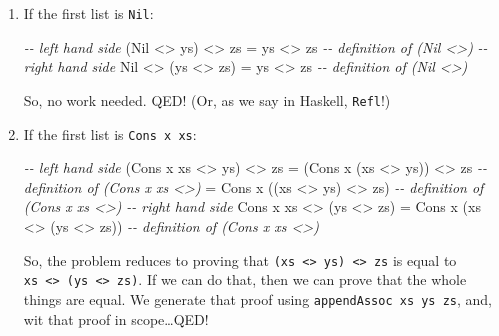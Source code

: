 \documentclass[]{article}
\newenvironment{Shaded}{}{}
\newcommand{\CommentTok}[1]{\textcolor[rgb]{0.38,0.63,0.69}{\textit{#1}}}
\newcommand{\DataTypeTok}[1]{\textcolor[rgb]{0.56,0.13,0.00}{#1}}
\newcommand{\NormalTok}[1]{#1}
\newcommand{\OperatorTok}[1]{\textcolor[rgb]{0.40,0.40,0.40}{#1}}
\newcommand{\OtherTok}[1]{\textcolor[rgb]{0.00,0.44,0.13}{#1}}
\begin{document}
\begin{enumerate}
\def\labelenumi{\arabic{enumi}.}
\item
  If the first list is \texttt{Nil}:

\begin{Shaded}
\begin{Highlighting}[]
\CommentTok{{-}{-} left hand side}
\NormalTok{(}\DataTypeTok{Nil} \OperatorTok{<>}\NormalTok{ ys) }\OperatorTok{<>}\NormalTok{ zs}
  \OtherTok{=}\NormalTok{ ys }\OperatorTok{<>}\NormalTok{ zs        }\CommentTok{{-}{-} definition of \textasciigrave{}(Nil <>)\textasciigrave{}}
\CommentTok{{-}{-} right hand side}
\DataTypeTok{Nil} \OperatorTok{<>}\NormalTok{ (ys }\OperatorTok{<>}\NormalTok{ zs)}
  \OtherTok{=}\NormalTok{ ys }\OperatorTok{<>}\NormalTok{ zs        }\CommentTok{{-}{-} definition of \textasciigrave{}(Nil <>)\textasciigrave{}}
\end{Highlighting}
\end{Shaded}

  So, no work needed. QED! (Or, as we say in Haskell, \texttt{Refl}!)
\item
  If the first list is \texttt{Cons\ x\ xs}:

\begin{Shaded}
\begin{Highlighting}[]
\CommentTok{{-}{-} left hand side}
\NormalTok{(}\DataTypeTok{Cons}\NormalTok{ x xs }\OperatorTok{<>}\NormalTok{ ys) }\OperatorTok{<>}\NormalTok{ zs}
  \OtherTok{=}\NormalTok{ (}\DataTypeTok{Cons}\NormalTok{ x (xs }\OperatorTok{<>}\NormalTok{ ys)) }\OperatorTok{<>}\NormalTok{ zs   }\CommentTok{{-}{-} definition of \textasciigrave{}(Cons x xs <>)\textasciigrave{}}
  \OtherTok{=} \DataTypeTok{Cons}\NormalTok{ x ((xs }\OperatorTok{<>}\NormalTok{ ys) }\OperatorTok{<>}\NormalTok{ zs)   }\CommentTok{{-}{-} definition of \textasciigrave{}(Cons x xs <>)\textasciigrave{}}
\CommentTok{{-}{-} right hand side}
\DataTypeTok{Cons}\NormalTok{ x xs }\OperatorTok{<>}\NormalTok{ (ys }\OperatorTok{<>}\NormalTok{ zs)}
  \OtherTok{=} \DataTypeTok{Cons}\NormalTok{ x (xs }\OperatorTok{<>}\NormalTok{ (ys }\OperatorTok{<>}\NormalTok{ zs))   }\CommentTok{{-}{-} definition of \textasciigrave{}(Cons x xs <>)\textasciigrave{}}
\end{Highlighting}
\end{Shaded}

  So, the problem reduces to proving that
  \texttt{(xs\ \textless{}\textgreater{}\ ys)\ \textless{}\textgreater{}\ zs} is
  equal to
  \texttt{xs\ \textless{}\textgreater{}\ (ys\ \textless{}\textgreater{}\ zs)}.
  If we can do that, then we can prove that the whole things are equal. We
  generate that proof using \texttt{appendAssoc\ xs\ ys\ zs}, and, wit that
  proof in scope\ldots QED!
\end{enumerate}
\end{document}
